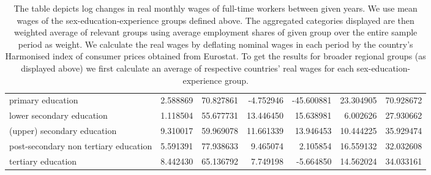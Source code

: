 \documentclass{article}
\begin{document}
\begin{table}[!htbp]
\begin{center}
{\begin{tabular}{lrrrrrr}
primary education                     &   2.588869 &  70.827861 &  -4.752946 & -45.600881 &  23.304905 &  70.928672 \\
lower secondary education             &   1.118504 &  55.677731 &  13.446450 &  15.638981 &   6.002626 &  27.930662 \\
(upper) secondary education           &   9.310017 &  59.969078 &  11.661339 &  13.946453 &  10.444225 &  35.929474 \\
post-secondary non tertiary education &   5.591391 &  77.938633 &   9.465074 &   2.105854 &  16.559132 &  32.032608 \\
tertiary education                    &   8.442430 &  65.136792 &   7.749198 &  -5.664850 &  14.562024 &  34.033161 \\
\bottomrule
\end{tabular}

}
\caption*{\footnotesize The table depicts log changes in real monthly wages of full-time workers between given years. We use mean wages of the sex-education-experience groups defined above. The aggregated categories displayed are then weighted average of relevant groups using average employment shares of given group over the entire sample period as weight. We calculate the real wages by deflating nominal wages in each period by the country's Harmonised index of consumer prices obtained from Eurostat. To get the results for broader regional groups (as displayed above) we first calculate an average of respective countries' real wages for each sex-education-experience group. }
\end{center}
\end{table}
\end{document}
